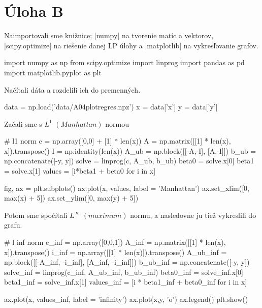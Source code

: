 \documentclass[12pt,oneside,a4paper,slovak]{article}
\begin{document}
   

\section*{Úloha B}
Naimportovali sme knižnice; \pyth|numpy| na tvorenie matíc a vektorov, \pyth|scipy.optimize| na riešenie danej LP úlohy a \pyth|matplotlib| na vykresľovanie grafov.
\begin{python}
import numpy as np
from scipy.optimize import linprog
import pandas as pd
import matplotlib.pyplot as plt
\end{python}
Načítali dáta a rozdelili ich do premenných.
\begin{python}
data = np.load('data/A04plotregres.npz')
x = data['x']
y = data['y']
\end{python}
Začali sme s $L^1$ $(Manhattan)$ normou
\begin{python}
# l1 norm
c = np.array([0,0] + [1] * len(x))
A = np.matrix([[1] * len(x), x]).transpose()
I = np.identity(len(x))
A_ub = np.block([[-A,-I], [A,-I]])
b_ub = np.concatenate([-y, y])
solve = linprog(c, A_ub, b_ub)
beta0 = solve.x[0]
beta1 = solve.x[1]
values = [i*beta1 + beta0 for i in x]
\end{python}
\begin{python}
fig, ax = plt.subplots()
ax.plot(x, values, label = 'Manhattan')
ax.set_xlim([0, max(x) + 5])
ax.set_ylim([0, max(y) + 5]) 
\end{python}
Potom sme spočítali $L^\infty$ $(maximum)$ normu, a nasledovne ju tiež vykreslili do grafu.
\begin{python}
# l inf norm
c_inf = np.array([0,0,1])
A_inf = np.matrix([[1] * len(x), x]).transpose()
i_inf = np.array([[1] * len(x)]).transpose()
A_ub_inf = np.block([[-A_inf, -i_inf], [A_inf, -i_inf]])
b_ub_inf = np.concatenate([-y, y])
solve_inf = linprog(c_inf, A_ub_inf, b_ub_inf)
beta0_inf = solve_inf.x[0]
beta1_inf = solve_inf.x[1]
values_inf = [i * beta1_inf + beta0_inf for i in x]
\end{python}
\begin{python}
ax.plot(x, values_inf, label = 'infinity')
ax.plot(x,y, 'o')
ax.legend()
plt.show()
\end{python}
\end{document}

